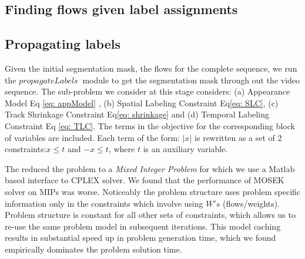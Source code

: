 \subsection{Finding flows given label assignments}


\subsection{Propagating labels}
Given the initial segmentation mask, the flows for the complete sequence, we run the
$propagateLabels~$ module to get the segmentation mask through out the video 
sequence. 
The sub-problem we consider at this stage considers: (a) Appearance Model Eq
\eqref{eq: appModel} , (b) Spatial Labeling Constraint Eq\eqref{eq: SLC}, (c) Track 
Shrinkage Constraint Eq\eqref{eq: shrinkage} and (d) Temporal Labeling Constraint Eq
\eqref{eq: TLC}.
The terms in the objective for the corresponding block of variables are included. 
Each term of the form: $|x|$ is rewritten as a set of 2 constraints:$x \leq t$ and $-x \leq t$, where $t$ is an auxiliary variable. 

The reduced the problem to a \textit{Mixed Integer Problem} for which we use a 
Matlab based interface to CPLEX solver. We found that the performance of MOSEK 
solver on MIPs was worse. Noticeably the problem structure uses problem specific information only in the constraints which involve using $W's$ (flows/weights). Problem
structure is constant for all other sets of constraints, which allows us to re-use the 
same problem model in subsequent iterations. This model caching results in
substantial speed up in problem generation time, which we found empirically 
dominates the problem solution time. 